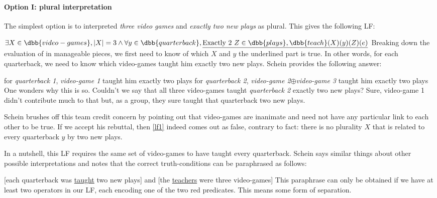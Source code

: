 \paragraph{Option I: plural interpretation} The simplest option is to interpreted \emph{three video games} and \emph{exactly two new plays} as plural. This gives the following LF:

\ex\label{lf1}
$\exists X\in \dbb{video-games}, |X| = 3 \wedge \forall y\in \dbb{quarterback}, \underline{\text{Exactly 2 } Z\in \dbb{plays},  \dbb{teach}(X)(y)(Z)(e)}$
\xe
%
Breaking down the evaluation of \clastx in manageable pieces, we first need to know of which $X$ and $y$ the underlined part is true. In other words, for each quarterback, we need to know which video-games taught him exactly two new plays. Schein provides the following answer:

\pex
\a for \emph{quarterback 1}, \emph{video-game 1} taught him exactly two plays
\a for \emph{quarterback 2}, \emph{video-game 2}$\oplus$\emph{video-game 3} taught him exactly two plays
\xe
%
One wonders why this is so. Couldn't we say that all three video-games taught \emph{quarterback 2} exactly two new plays? Sure, video-game 1 didn't contribute much to that but, as a group, they sure taught that quarterback two new plays.

Schein brushes off this team credit concern by pointing out that video-games are inanimate and need not have any particular link to each other to be true\footnotemark{}. If we accept his rebuttal, then \cref{lf1} indeed comes out as false, contrary to fact: there is no plurality $X$ that is related to every quarterback $y$ by two new plays.

In a nutshell, this LF requires the same set of video-games to have taught every quarterback. Schein says similar things about other possible interpretations and notes that the correct truth-conditions can be paraphrased as follows:

\ex{}%
[each quarterback was \underline{taught} two new plays] and [the \underline{teachers} were three video-games]
\xe
%
This paraphrase can only be obtained if we have at least two operators in our LF, each encoding one of the two red predicates. This means some form of separation.


